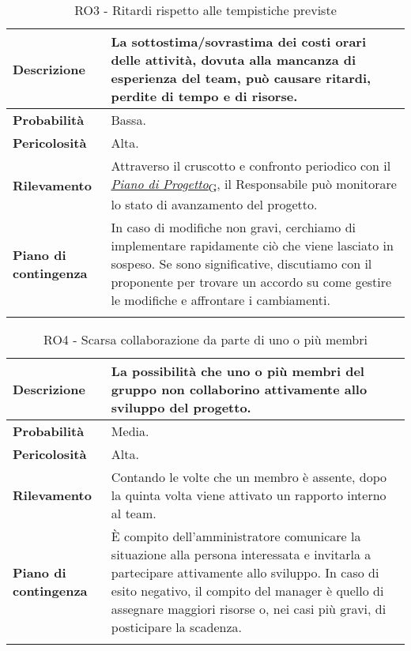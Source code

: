 \begin{longtable}{ | l | p{10cm} | }
    \hline
    \textbf{Descrizione} & La sottostima/sovrastima dei costi orari delle attività, dovuta alla mancanza di esperienza del team, può causare ritardi, perdite di tempo e di risorse. \\
    \hline
    \textbf{Probabilità} & Bassa. \\
    \hline
    \textbf{Pericolosità} & Alta. \\
    \hline
    \textbf{Rilevamento} & Attraverso il cruscotto e confronto periodico con il \href{https://7last.github.io/docs/rtb/documentazione-interna/glossario#piano-di-progetto}{\textit{Piano di Progetto}\textsubscript{G}}, il Responsabile può monitorare lo stato di avanzamento del progetto.\\
    \hline
    \textbf{Piano di contingenza} & In caso di modifiche non gravi, cerchiamo di implementare rapidamente ciò che viene lasciato in sospeso. Se sono significative, discutiamo con il proponente per trovare un accordo su come gestire le modifiche e affrontare i cambiamenti.\\
    \hline
    \caption{RO3 - Ritardi rispetto alle tempistiche previste}
    \label{table:3}
\end{longtable}

\begin{longtable}{ | l | p{10cm} | }
    \hline
    \textbf{Descrizione} & La possibilità che uno o più membri del gruppo non collaborino attivamente allo sviluppo del progetto. \\
    \hline
    \textbf{Probabilità} & Media. \\
    \hline
    \textbf{Pericolosità} & Alta. \\
    \hline
    \textbf{Rilevamento} & Contando le volte che un membro è assente, dopo la quinta volta viene attivato un rapporto interno al team.\\
    \hline
    \textbf{Piano di contingenza} & È compito dell'amministratore comunicare la situazione alla persona interessata e invitarla a partecipare attivamente allo sviluppo. In caso di esito negativo, il compito del manager è quello di assegnare maggiori risorse o, nei casi più gravi, di posticipare la scadenza.\\
    \hline
    \caption{RO4 - Scarsa collaborazione da parte di uno o più membri}
    \label{table:4}
\end{longtable}


